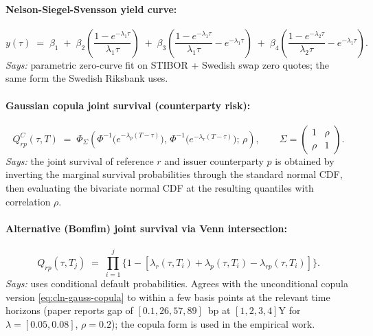 \documentclass[11pt,a4paper]{article}
\begin{document}
\paragraph{Nelson-Siegel-Svensson yield curve:}
\begin{equation}\label{eq:cln-nss}
  y(\tau) \;=\; \beta_1 \;+\; \beta_2 \!\left( \frac{1 - e^{-\lambda_1 \tau}}{\lambda_1 \tau} \right)
              \;+\; \beta_3 \!\left( \frac{1 - e^{-\lambda_1 \tau}}{\lambda_1 \tau} - e^{-\lambda_1 \tau} \right)
              \;+\; \beta_4 \!\left( \frac{1 - e^{-\lambda_2 \tau}}{\lambda_2 \tau} - e^{-\lambda_1 \tau} \right).
\end{equation}
\textit{Says:} parametric zero-curve fit on STIBOR + Swedish swap zero
quotes; the same form the Swedish Riksbank uses.

\paragraph{Gaussian copula joint survival (counterparty risk):}
\begin{equation}\label{eq:cln-gauss-copula}
  Q^C_{rp}(\tau, T) \;=\; \Phi_\Sigma\!\left( \Phi^{-1}\!\bigl(e^{-\lambda_p (T - \tau)}\bigr),\, \Phi^{-1}\!\bigl(e^{-\lambda_r (T - \tau)}\bigr);\, \rho \right),
  \qquad
  \Sigma = \begin{pmatrix} 1 & \rho \\ \rho & 1 \end{pmatrix}.
\end{equation}
\textit{Says:} the joint survival of reference $r$ and issuer
counterparty $p$ is obtained by inverting the marginal survival
probabilities through the standard normal CDF, then evaluating the
bivariate normal CDF at the resulting quantiles with correlation
$\rho$.

\paragraph{Alternative (Bomfim) joint survival via Venn intersection:}
\begin{equation}\label{eq:cln-bomfim}
  Q_{rp}(\tau, T_j) \;=\; \prod_{i=1}^{j} \bigl\{ 1 - [\lambda_r(\tau, T_i) + \lambda_p(\tau, T_i) - \lambda_{rp}(\tau, T_i)] \bigr\}.
\end{equation}
\textit{Says:} uses conditional default probabilities. Agrees with the
unconditional copula version \eqref{eq:cln-gauss-copula} to
within a few basis points at the relevant time horizons (paper
reports gap of $[0.1, 26, 57, 89]$~bp at $[1, 2, 3, 4]$Y for
$\lambda = [0.05, 0.08]$, $\rho = 0.2$); the copula form is used in
the empirical work.
\end{document}
